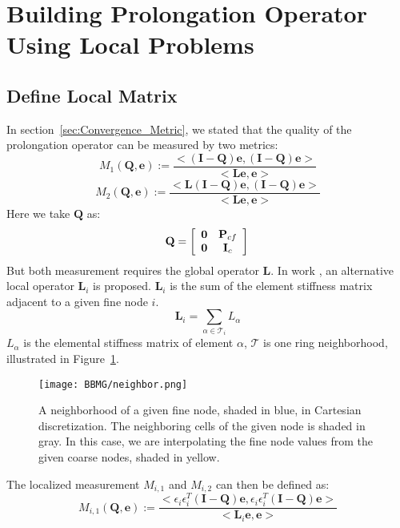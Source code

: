 \section{Building Prolongation Operator Using Local Problems}
\subsection{Define Local Matrix}
In section~\ref{sec:Convergence_Metric}, we stated that the quality of the prolongation operator can be measured by two metrics:
 \begin{equation}
M_1(\mathbf{Q},\mathbf{e}) := \frac{<(\mathbf{I}-\mathbf{Q})\mathbf{e}, (\mathbf{I}-\mathbf{Q})\mathbf{e}>}{<\mathbf{L}\mathbf{e},\mathbf{e}>}
\end{equation}
\begin{equation}
M_2(\mathbf{Q},\mathbf{e}) := \frac{<\mathbf{L}(\mathbf{I}-\mathbf{Q})\mathbf{e}, (\mathbf{I}-\mathbf{Q})\mathbf{e}>}{<\mathbf{L}\mathbf{e},\mathbf{e}>}
\end{equation}
Here we take $\mathbf{Q}$ as:
$$
  \mathbf{Q} = \left[ \begin{array}{cc}
    \mathbf{0} & \mathbf{P}_{cf} \\
    \mathbf{0} & \mathbf{I}_c
  \end{array}\right]\\
$$
But both measurement requires the global operator $\mathbf{L}$. In work \cite{brezina2001algebraic}, an alternative local operator $\mathbf{L}_i$ is proposed. $\mathbf{L}_i$ is the sum of the element stiffness matrix adjacent to a given fine node $i$.
\begin{equation}
\mathbf{L}_i = \sum_{\alpha\in \mathcal{T}_i} L_\alpha
\label{equ:local_matrix}
\end{equation}
$L_\alpha$ is the elemental stiffness matrix of element $\alpha$, $\mathcal{T}$ is one ring neighborhood, illustrated in Figure~\ref{fig:neighbor_ring}.
\begin{figure}[t]
\texttt{[image: BBMG/neighbor.png]}
\centering
\caption{A neighborhood of a given fine node, shaded in blue, in Cartesian discretization. The neighboring cells of the given node is shaded in gray. In this case, we are interpolating the fine node values from the given coarse nodes, shaded in yellow.}
\label{fig:neighbor_ring}
\end{figure}
The localized measurement $M_{i,1}$ and $M_{i,2}$ can then be defined as:
 \begin{equation}
M_{i,1}(\mathbf{Q},\mathbf{e}) := \frac{<\epsilon_i\epsilon^T_i(\mathbf{I}-\mathbf{Q})\mathbf{e}, \epsilon_i\epsilon^T_i(\mathbf{I}-\mathbf{Q})\mathbf{e}>}{<\mathbf{L}_i\mathbf{e},\mathbf{e}>}
\end{equation}
